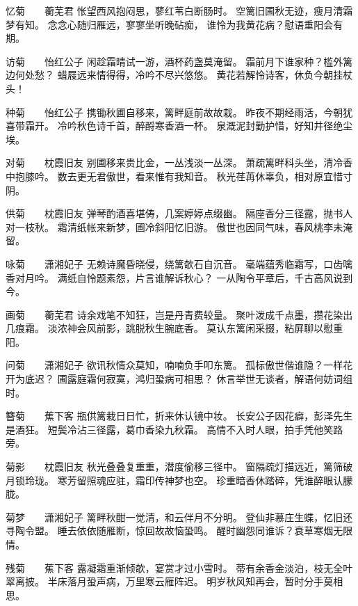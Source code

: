 \documentclass[12pt,oneside]{book}
\begin{document}
忆菊　　蘅芜君
怅望西风抱闷思，蓼红苇白断肠时。
空篱旧圃秋无迹，瘦月清霜梦有知。
念念心随归雁远，寥寥坐听晚砧痴，
谁怜为我黄花病？慰语重阳会有期。

访菊　　怡红公子
闲趁霜晴试一游，酒杯药盏莫淹留。
霜前月下谁家种？槛外篱边何处愁？
蜡屐远来情得得，冷吟不尽兴悠悠。
黄花若解怜诗客，休负今朝挂杖头！

种菊　　怡红公子
携锄秋圃自移来，篱畔庭前故故栽。
昨夜不期经雨活，今朝犹喜带霜开。
冷吟秋色诗千首，醉酹寒香酒一杯。
泉溉泥封勤护惜，好知井径绝尘埃。

对菊　　枕霞旧友
别圃移来贵比金，一丛浅淡一丛深。
萧疏篱畔科头坐，清冷香中抱膝吟。
数去更无君傲世，看来惟有我知音。
秋光荏苒休辜负，相对原宜惜寸阴。

供菊　　枕霞旧友
弹琴酌酒喜堪俦，几案婷婷点缀幽。
隔座香分三径露，抛书人对一枝秋。
霜清纸帐来新梦，圃冷斜阳忆旧游。
傲世也因同气味，春风桃李未淹留。

咏菊　　潇湘妃子
无赖诗魔昏晓侵，绕篱欹石自沉音。
毫端蕴秀临霜写，口齿噙香对月吟。
满纸自怜题素怨，片言谁解诉秋心？
一从陶令平章后，千古高风说到今。

画菊　　蘅芜君
诗余戏笔不知狂，岂是丹青费较量。
聚叶泼成千点墨，攒花染出几痕霜。
淡浓神会风前影，跳脱秋生腕底香。
莫认东篱闲采掇，粘屏聊以慰重阳。

问菊　　潇湘妃子
欲讯秋情众莫知，喃喃负手叩东篱。
孤标傲世偕谁隐？一样花开为底迟？
圃露庭霜何寂寞，鸿归蛩病可相思？
休言举世无谈者，解语何妨词组时。

簪菊　　蕉下客
瓶供篱栽日日忙，折来休认镜中妆。
长安公子因花癖，彭泽先生是酒狂。
短鬓冷沾三径露，葛巾香染九秋霜。
高情不入时人眼，拍手凭他笑路旁。

菊影　　枕霞旧友
秋光叠叠复重重，潜度偷移三径中。
窗隔疏灯描远近，篱筛破月锁玲珑。
寒芳留照魂应驻，霜印传神梦也空。
珍重暗香休踏碎，凭谁醉眼认朦胧。

菊梦　　潇湘妃子
篱畔秋酣一觉清，和云伴月不分明。
登仙非慕庄生蝶，忆旧还寻陶令盟。
睡去依依随雁断，惊回故故恼蛩鸣。
醒时幽怨同谁诉？衰草寒烟无限情。

残菊　　蕉下客
露凝霜重渐倾欹，宴赏才过小雪时。
蒂有余香金淡泊，枝无全叶翠离披。
半床落月蛩声病，万里寒云雁阵迟。
明岁秋风知再会，暂时分手莫相思。
\end{document}
